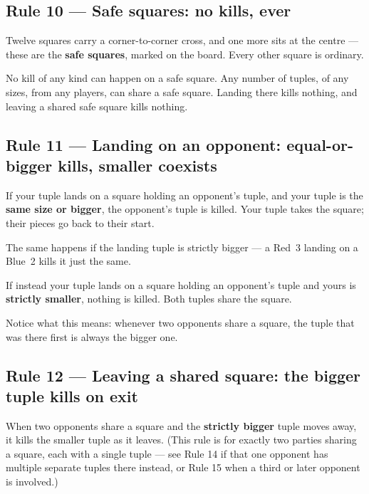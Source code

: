 \documentclass[10pt,a4paper]{article}
\newcommand{\ruletitle}[2]{\subsection*{Rule #1 --- #2}}
\begin{document}
\ruletitle{10}{Safe squares: no kills, ever}

Twelve squares carry a corner-to-corner cross, and one more sits at the
centre --- these are the \textbf{safe squares}, marked on the board. Every
other square is ordinary.

No kill of any kind can happen on a safe square. Any number of tuples, of any
sizes, from any players, can share a safe square. Landing there kills nothing,
and leaving a shared safe square kills nothing.

\begin{center}
  
\end{center}

\newpage
\ruletitle{11}{Landing on an opponent: equal-or-bigger kills, smaller coexists}

If your tuple lands on a square holding an opponent's tuple, and your tuple is
the \textbf{same size or bigger}, the opponent's tuple is killed. Your tuple
takes the square; their pieces go back to their start.

\begin{center}
  
\end{center}

The same happens if the landing tuple is strictly bigger --- a Red~3 landing
on a Blue~2 kills it just the same.

If instead your tuple lands on a square holding an opponent's tuple and
yours is \textbf{strictly smaller}, nothing is killed. Both tuples share the
square.

\begin{center}
  
\end{center}

Notice what this means: whenever two opponents share a square, the tuple that
was there first is always the bigger one.

\ruletitle{12}{Leaving a shared square: the bigger tuple kills on exit}

When two opponents share a square and the \textbf{strictly bigger} tuple moves
away, it kills the smaller tuple as it leaves. (This rule is for exactly two
parties sharing a square, each with a single tuple --- see Rule 14 if that
one opponent has multiple separate tuples there instead, or Rule 15 when a
third or later opponent is involved.)

\begin{center}
  
\end{center}
\end{document}
